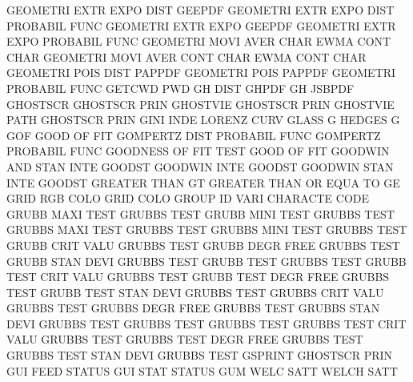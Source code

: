 GEOMETRI EXTR EXPO DIST                 GEEPDF
GEOMETRI EXTR EXPO DIST                 PROBABIL FUNC
GEOMETRI EXTR EXPO                      GEEPDF
GEOMETRI EXTR EXPO                      PROBABIL FUNC
GEOMETRI MOVI AVER CHAR                 EWMA     CONT CHAR
GEOMETRI MOVI AVER CONT CHAR            EWMA     CONT CHAR
GEOMETRI POIS DIST                      PAPPDF
GEOMETRI POIS                           PAPPDF
GEOMETRI                                PROBABIL FUNC
GETCWD                                  PWD
GH       DIST                           GHPDF
GH                                      JSBPDF
GHOSTSCR                                GHOSTSCR PRIN
GHOSTVIE                                GHOSTSCR PRIN
GHOSTVIE PATH                           GHOSTSCR PRIN
GINI     INDE                           LORENZ   CURV
GLASS    G                              HEDGES   G
GOF                                     GOOD     OF   FIT
GOMPERTZ DIST                           PROBABIL FUNC
GOMPERTZ                                PROBABIL FUNC
GOODNESS OF   FIT  TEST                 GOOD     OF   FIT
GOODWIN  AND  STAN INTE                 GOODST
GOODWIN  INTE                           GOODST
GOODWIN  STAN INTE                      GOODST
GREATER  THAN                           GT
GREATER  THAN OR   EQUA TO              GE
GRID     RGB  COLO                      GRID     COLO
GROUP    ID   VARI                      CHARACTE CODE
GRUBB    MAXI TEST                      GRUBBS   TEST
GRUBB    MINI TEST                      GRUBBS   TEST
GRUBBS   MAXI TEST                      GRUBBS   TEST
GRUBBS   MINI TEST                      GRUBBS   TEST
GRUBB    CRIT VALU                      GRUBBS   TEST
GRUBB    DEGR FREE                      GRUBBS   TEST
GRUBB    STAN DEVI                      GRUBBS   TEST
GRUBB    TEST                           GRUBBS   TEST
GRUBB    TEST CRIT VALU                 GRUBBS   TEST
GRUBB    TEST DEGR FREE                 GRUBBS   TEST
GRUBB    TEST STAN DEVI                 GRUBBS   TEST
GRUBBS   CRIT VALU                      GRUBBS   TEST
GRUBBS   DEGR FREE                      GRUBBS   TEST
GRUBBS   STAN DEVI                      GRUBBS   TEST
GRUBBS   TEST                           GRUBBS   TEST
GRUBBS   TEST CRIT VALU                 GRUBBS   TEST
GRUBBS   TEST DEGR FREE                 GRUBBS   TEST
GRUBBS   TEST STAN DEVI                 GRUBBS   TEST
GSPRINT                                 GHOSTSCR PRIN
GUI      FEED                           STATUS
GUI      STAT                           STATUS
GUM      WELC SATT                      WELCH    SATT
